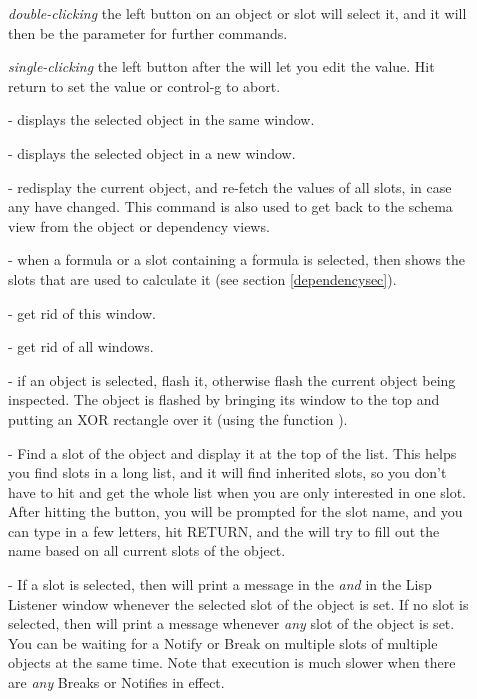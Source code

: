 \begin{description}
\item[] {\it double-clicking} the left button on an object or slot will select it, and it will
then be the parameter for further commands.

\item[] {\it single-clicking} the left button after the \pr{=} will let you edit
the value.  Hit return to set the value or control-g to abort.

\item[]  - displays the selected object in the same window.

\item[]  - displays the selected object in a new window.

\item[]  - redisplay the current object, and re-fetch the values
of all slots, in case any have changed.  This command is also used to
get back to the schema view from the object or dependency views.

\item[]  - when a formula or a slot containing a formula is
selected, then shows the slots that are used to calculate it (see
section \ref{dependencysec}).

\item[]  - get rid of this  window.

\item[]  - get rid of all  windows.

\item[]  - if an object is selected, flash it, otherwise flash the
current object being inspected.  The object is flashed by bringing its
window to the top and putting an XOR rectangle over it (using the
function ).

\item[]  - Find a slot of the object and display it at the top of
the list.  This helps you find slots in a long list, and it will find
inherited slots, so you don't have to hit  and get
the whole list when you are only interested in one slot.  After
hitting the  button, you will be prompted for the slot
name, and you can type in a few letters, hit RETURN, and the 
will try to fill out the name based on all current slots of the object.

\item[]  - If a slot is selected, then will print a message in the
 {\it and} in the Lisp Listener window
whenever the selected slot of the object is set.  If no slot is
selected, then will print a message whenever {\it any} slot of
the object is set.  You can be waiting for a Notify or Break on
multiple slots of multiple objects at the same time.  Note that
execution is much slower when there are {\it any} Breaks or Notifies
in effect.


\end{description}

